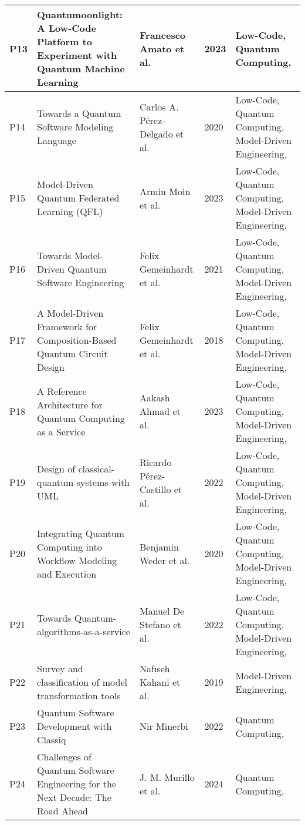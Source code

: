 \begin{longtable}{|m{0.8cm}|m{4.4cm}|m{3cm}|m{0.8cm}|m{4cm}|}
    P13 & Quantumoonlight: A Low-Code Platform to Experiment with Quantum Machine Learning & Francesco Amato et al.~\cite{amato2023quantumoonlight} & 2023 & Low-Code, Quantum Computing,  \\ \hline
    P14 & Towards a Quantum Software Modeling Language & Carlos A. Pérez-Delgado et al.~\cite{Perez-Delgado_2020} & 2020 & Low-Code, Quantum Computing, Model-Driven Engineering,  \\ \hline
    P15 & Model-Driven Quantum Federated Learning (QFL) & Armin Moin et al.~\cite{Moin_2023} & 2023 & Low-Code, Quantum Computing, Model-Driven Engineering,  \\ \hline
    P16 & Towards Model-Driven Quantum Software Engineering & Felix Gemeinhardt et al.~\cite{gemeinhardt_2021} & 2021 & Low-Code, Quantum Computing, Model-Driven Engineering,  \\ \hline
    P17 & A Model-Driven Framework for Composition-Based Quantum Circuit Design & Felix Gemeinhardt et al.~\cite{Gemeinhardt_2018} & 2018 & Low-Code, Quantum Computing, Model-Driven Engineering,  \\ \hline
    P18 & A Reference Architecture for Quantum Computing as a Service & Aakash Ahmad et al.~\cite{Ahmad_2023} & 2023 & Low-Code, Quantum Computing, Model-Driven Engineering,  \\ \hline
    P19 & Design of classical-quantum systems with UML & Ricardo Pérez-Castillo et al.~\cite{perez2022design} & 2022 & Low-Code, Quantum Computing, Model-Driven Engineering,  \\ \hline
    P20 & Integrating Quantum Computing into Workflow Modeling and Execution & Benjamin Weder et al.~\cite{Weder_2020} & 2020 & Low-Code, Quantum Computing, Model-Driven Engineering,  \\ \hline
    P21 & Towards Quantum-algorithms-as-a-service & Manuel De Stefano et al.~\cite{Stefano_2022} & 2022 & Low-Code, Quantum Computing, Model-Driven Engineering,  \\ \hline
    P22 & Survey and classification of model transformation tools & Nafıseh Kahani et al.~\cite{Kahani_2019} & 2019 & Model-Driven Engineering,  \\ \hline
    P23 & Quantum Software Development with Classiq & Nir Minerbi~\cite{minerbi2022quantum} & 2022 & Quantum Computing,  \\ \hline
    P24 & Challenges of Quantum Software Engineering for the Next Decade: The Road Ahead & J. M. Murillo et al.~\cite{murillo2024challenges} & 2024 & Quantum Computing,  \\ \hline

\end{longtable}
